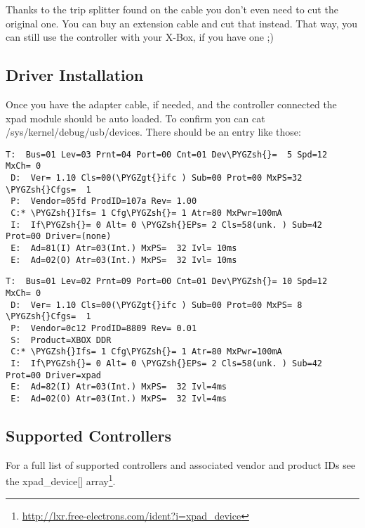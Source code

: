 \documentclass[a4paper,8pt,english]{sphinxmanual}
\def\PYGZgt{\char`\>}
\def\PYGZsh{\char`\#}
\begin{document}
Thanks to the trip splitter found on the cable you don't even need to cut the
original one. You can buy an extension cable and cut that instead. That way,
you can still use the controller with your X-Box, if you have one ;)


\subsection{Driver Installation}
\label{input/devices/xpad:driver-installation}
Once you have the adapter cable, if needed, and the controller connected
the xpad module should be auto loaded. To confirm you can cat
/sys/kernel/debug/usb/devices. There should be an entry like those:

\needspace{\literalblockneedspace}\vspace{\literalblockcaptiontopvspace}
\begin{Verbatim}[commandchars=\\\{\}]
 T:  Bus=01 Lev=03 Prnt=04 Port=00 Cnt=01 Dev\PYGZsh{}=  5 Spd=12  MxCh= 0
 D:  Ver= 1.10 Cls=00(\PYGZgt{}ifc ) Sub=00 Prot=00 MxPS=32 \PYGZsh{}Cfgs=  1
 P:  Vendor=05fd ProdID=107a Rev= 1.00
 C:* \PYGZsh{}Ifs= 1 Cfg\PYGZsh{}= 1 Atr=80 MxPwr=100mA
 I:  If\PYGZsh{}= 0 Alt= 0 \PYGZsh{}EPs= 2 Cls=58(unk. ) Sub=42 Prot=00 Driver=(none)
 E:  Ad=81(I) Atr=03(Int.) MxPS=  32 Ivl= 10ms
 E:  Ad=02(O) Atr=03(Int.) MxPS=  32 Ivl= 10ms
\end{Verbatim}
\label{input/devices/xpad:dump-from-interact-powerpad-pro-germany}

\needspace{\literalblockneedspace}\vspace{\literalblockcaptiontopvspace}
\begin{Verbatim}[commandchars=\\\{\}]
 T:  Bus=01 Lev=02 Prnt=09 Port=00 Cnt=01 Dev\PYGZsh{}= 10 Spd=12  MxCh= 0
 D:  Ver= 1.10 Cls=00(\PYGZgt{}ifc ) Sub=00 Prot=00 MxPS= 8 \PYGZsh{}Cfgs=  1
 P:  Vendor=0c12 ProdID=8809 Rev= 0.01
 S:  Product=XBOX DDR
 C:* \PYGZsh{}Ifs= 1 Cfg\PYGZsh{}= 1 Atr=80 MxPwr=100mA
 I:  If\PYGZsh{}= 0 Alt= 0 \PYGZsh{}EPs= 2 Cls=58(unk. ) Sub=42 Prot=00 Driver=xpad
 E:  Ad=82(I) Atr=03(Int.) MxPS=  32 Ivl=4ms
 E:  Ad=02(O) Atr=03(Int.) MxPS=  32 Ivl=4ms
\end{Verbatim}
\label{input/devices/xpad:dump-from-redoctane-xbox-dance-pad-us}


\subsection{Supported Controllers}
\label{input/devices/xpad:supported-controllers}
For a full list of supported controllers and associated vendor and product
IDs see the xpad\_device{[}{]} array\footnote[4]{
\href{http://lxr.free-electrons.com/ident?i=xpad\_device}{http://lxr.free-electrons.com/ident?i=xpad\_device}
}.
\end{document}
